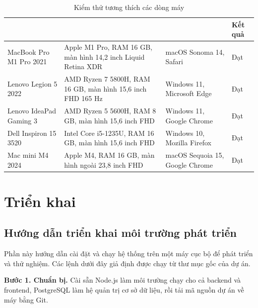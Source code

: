 \documentclass[../DoAn.tex]{subfiles}
\begin{document}
\begin{table}[H]
\centering
\setlength{\tabcolsep}{4pt}\renewcommand{\arraystretch}{1.25}
\begin{tabular}{|>{\raggedright\arraybackslash\hyphenpenalty=10000}m{3.2cm}|>{\raggedright\arraybackslash\hyphenpenalty=10000}m{4.2cm}|>{\raggedright\arraybackslash\hyphenpenalty=10000}m{3.6cm}|>{\centering\arraybackslash}m{2.4cm}|}
\hline
\multicolumn{1}{|c|}{\textbf{Thiết bị}} & \multicolumn{1}{c|}{\textbf{Phần cứng}} & \multicolumn{1}{c|}{\textbf{Phần mềm}} & \textbf{Kết quả} \\ \hline
MacBook Pro M1 Pro 2021 & Apple M1 Pro, RAM 16 GB, màn hình 14,2 inch Liquid Retina XDR & macOS Sonoma 14, Safari & Đạt \\ \hline
Lenovo Legion 5 2022 & AMD Ryzen 7 5800H, RAM 16 GB, màn hình 15,6 inch FHD 165 Hz & Windows 11, Microsoft Edge & Đạt \\ \hline
Lenovo IdeaPad Gaming 3 & AMD Ryzen 5 5600H, RAM 8 GB, màn hình 15,6 inch FHD & Windows 11, Google Chrome & Đạt \\ \hline
Dell Inspiron 15 3520 & Intel Core i5-1235U, RAM 16 GB, màn hình 15,6 inch FHD & Windows 10, Mozilla Firefox & Đạt \\ \hline
Mac mini M4 2024 & Apple M4, RAM 16 GB, màn hình ngoài 23,8 inch FHD & macOS Sequoia 15, Google Chrome & Đạt \\ \hline
\end{tabular}

\caption{Kiểm thử tương thích các dòng máy}
\label{tab:kt-trinhduyet}
\end{table}

\section{Triển khai}
\label{section:4.5}

\subsection{Hướng dẫn triển khai môi trường phát triển}
\label{subsection:4.5.2}

Phần này hướng dẫn cài đặt và chạy hệ thống trên một máy cục bộ để phát triển và thử nghiệm. Các lệnh dưới đây giả định được chạy từ thư mục gốc của dự án.

\textbf{Bước 1. Chuẩn bị.} Cài sẵn Node.js làm môi trường chạy cho cả backend và frontend, PostgreSQL làm hệ quản trị cơ sở dữ liệu, rồi tải mã nguồn dự án về máy bằng Git.
\end{document}
